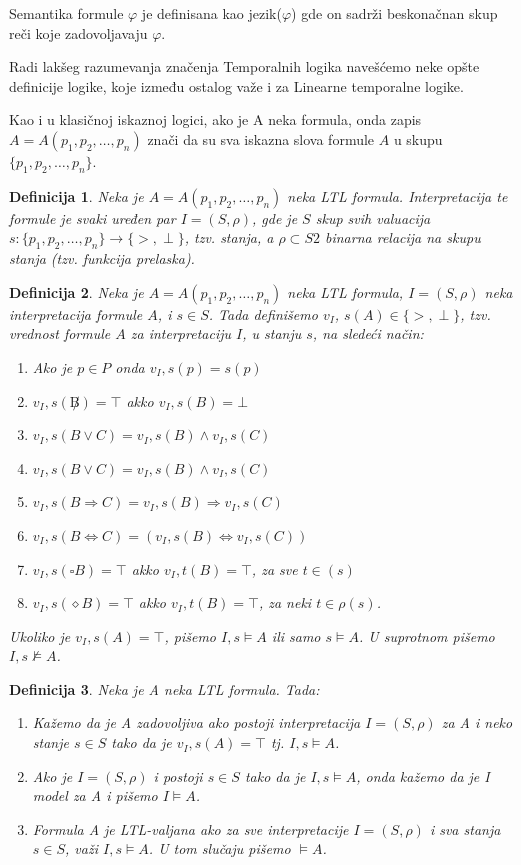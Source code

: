 \documentclass[a4paper]{article}
\newtheorem{definicija}{Definicija}[section]
\begin{document}
{	Semantika formule $\varphi$ je definisana kao jezik($\varphi$) gde on sadrži beskonačnan skup reči koje zadovoljavaju $\varphi$.
	
	Radi lakšeg razumevanja značenja Temporalnih logika navešćemo neke opšte definicije logike, koje između ostalog važe i za Linearne temporalne logike.

	Kao i u klasičnoj iskaznoj logici, ako je A neka formula, onda zapis $A = A(p_1, p_2, \dots , p_n)$ znači da su sva iskazna slova formule $A$ u skupu $\{p_1, p_2, \dots , p_n\}$.
\begin{definicija}
Neka je $A = A(p_1, p_2, \dots , p_n)$ neka LTL formula. Interpretacija te formule je svaki uređen par $I = (S, \rho)$, gde je $S$ skup svih valuacija $s : \{p_1, p_2, \dots , p_n\} \to \{>, \perp \}$, tzv. stanja, a $\rho \subset S2$ binarna relacija na skupu stanja (tzv. funkcija prelaska).
\end{definicija}
\begin{definicija}    
Neka je $A = A(p_1, p_2, \dots , p_n)$ neka LTL formula, $I = (S, \rho)$ neka interpretacija formule $A$, i $s \in S$. Tada definišemo $v_I$, $s(A) \in \{>, \perp \}$, tzv. vrednost formule $A$ za interpretaciju $I$, u stanju $s$, na sledeći način:
\begin{enumerate}	
\item  Ako je $p \in P$ onda $v_I,s(p) = s(p)$
\item $v_I,s(\not B) = \top$ akko $v_I,s(B) = \bot$
\item  $v_I,s(B \vee C) = v_I,s(B) \wedge v_I,s(C)$
\item  $v_I,s(B \vee C) = v_I,s(B) \wedge v_I,s(C)$
\item $v_I,s(B \Rightarrow C) = v_I,s(B) \Rightarrow v_I,s(C)$
\item $v_I,s(B \Leftrightarrow C) = (v_I,s(B) \Leftrightarrow v_I,s(C))$
\item  $v_I,s(\square B) = \top$ akko $v_I,t(B) = \top$, za sve $t \in (s)$
\item $v_I,s(\diamond B) = \top$ akko $v_I,t(B) = \top$, za neki $t \in \rho(s)$.
\end{enumerate}	
Ukoliko je $v_I,s(A) = \top$, pišemo $I, s \models A$ ili samo $s \models A$. U suprotnom pišemo $I, s \nvDash A$.
\end{definicija} 
\begin{definicija}
Neka je A neka LTL formula. Tada:
\begin{enumerate}	
\item Kažemo da je A zadovoljiva ako postoji interpretacija $I = (S, \rho)$ za A i neko stanje $s \in S$ tako da je $v_I,s(A) = \top$ tj. $I, s \models A$.
\item Ako je $I = (S, \rho)$ i postoji $s \in S$ tako da je $I, s \models A$, onda kažemo da je I model za A i pišemo $I \models A$.
\item Formula A je LTL-valjana ako za sve interpretacije $I = (S, \rho)$ i sva stanja $s \in S$, važi $I, s \models A$. U tom slučaju pišemo $\models A$.\end{enumerate}	
\end{definicija}

}
\end{document}
